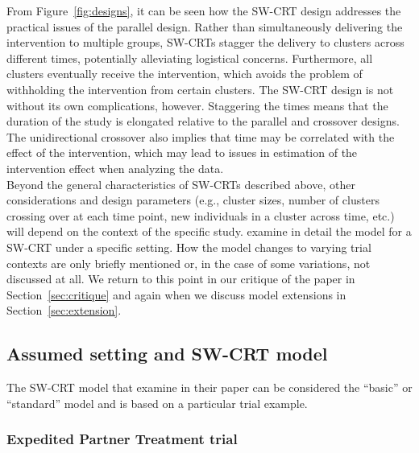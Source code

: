 \documentclass[10pt]{article}
\begin{document}
From Figure~\ref{fig:designs}, it can be seen how the SW-CRT design addresses the practical issues of the parallel design. Rather than simultaneously delivering the intervention to multiple groups, SW-CRTs stagger the delivery to clusters across different times, potentially alleviating logistical concerns. Furthermore, all clusters eventually receive the intervention, which avoids the problem of withholding the intervention from certain clusters. The SW-CRT design is not without its own complications, however. Staggering the times means that the duration of the study is elongated relative to the parallel and crossover designs. The unidirectional crossover also implies that time may be correlated with the effect of the intervention, which may lead to issues in estimation of the intervention effect when analyzing the data.
\\

Beyond the general characteristics of SW-CRTs described above, other considerations and design parameters (e.g., cluster sizes, number of clusters crossing over at each time point, new individuals in a cluster across time, etc.) will depend on the context of the specific study. \citeauthor{Hussey:2007} examine in detail the model for a SW-CRT under a specific setting. How the model changes to varying trial contexts are only briefly mentioned or, in the case of some variations, not discussed at all. We return to this point in our critique of the paper in Section~\ref{sec:critique} and again when we discuss model extensions in Section~\ref{sec:extension}.

\subsection{Assumed setting and SW-CRT model}

The SW-CRT model that \textcite{Hussey:2007} examine in their paper can be considered the ``basic'' or ``standard'' model and is based on a particular trial example.

\subsubsection{Expedited Partner Treatment trial}
\end{document}

